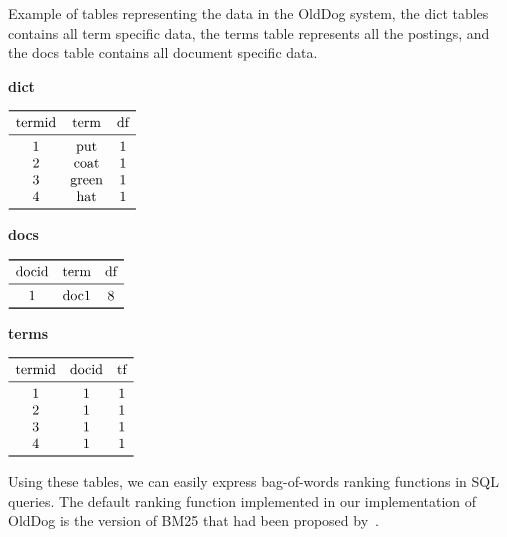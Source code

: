 \begin{table}
	\centering
	\caption{Example of tables representing the data in the OldDog system, the dict tables contains all term specific data, the terms table represents all the postings, and the docs table contains all document specific data.}
	\begin{subtable}[t]{0.3\linewidth}
		\centering
		\caption{\textbf{dict}}
		\(\begin{array}{ccc}
			\toprule
			\text{termid} & \text{term} & \text{df}  \\  
			\midrule
			1 & \text{put} 	 	& 1 \\ 
			2 & \text{coat}  	& 1 \\ 
			3 & \text{green}	& 1 \\ 
			4 & \text{hat} 	 	& 1 \\
			\bottomrule
		\end{array}\)
	\end{subtable}
	\begin{subtable}[t]{0.3\linewidth}
		\centering
		\caption{\textbf{docs}}
		\(\begin{array}{ccc}
			\toprule
			\text{docid} & \text{term} & \text{df}  \\  
			\midrule
			1 & \text{doc1} & 8 \\ 
			\bottomrule
		\end{array}\)
	\end{subtable}
	\begin{subtable}[t]{0.3\linewidth}
		\centering
		\caption{\textbf{terms}}
		\(\begin{array}{ccc}
			\toprule
			\text{termid} & \text{docid} & \text{tf}  \\  
			\midrule
			1 & 1 & 1 \\ 
			2 & 1 & 1 \\ 
			3 & 1 & 1 \\ 
			4 & 1 & 1 \\
			\bottomrule
		\end{array}\)
	\end{subtable}
	\label{olddog-tables}
\end{table}

Using these tables, we can easily express bag-of-words ranking functions in SQL queries. The default ranking function implemented in our implementation of OldDog is the version of BM25 that had been proposed by~\citet{bm25-robertson}.

